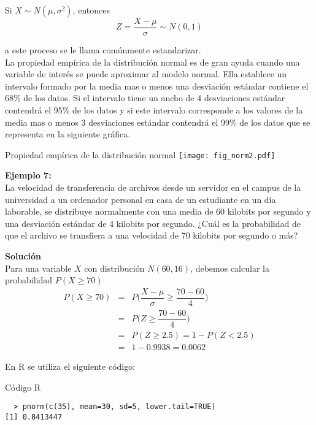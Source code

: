 \documentclass[base=hide,12pt]{elegantbook}
\begin{document}
Si $X \sim N(\mu, \sigma^{2})$, entonces \\

$$Z= \dfrac{X-\mu}{\sigma} \sim N(0,1)$$

a este proceso se le llama comúnmente estandarizar.\\

La propiedad empírica de la distribución normal es de gran ayuda cuando una variable  de interés se  puede aproximar al modelo normal. Ella establece un intervalo formado por la media mas o menos una desviación estándar contiene el 68\% de los datos. Si el intervalo tiene un ancho de 4 desviaciones estándar contendrá el 95\% de los datos y si este intervalo corresponde a los valores de la media mas o menos 3 desviaciones estándar contendrá el 99\% de los datos que se representa en la siguiente gráfica.

\begin{center}
	Propiedad empírica de la distribución normal  
	\texttt{[image: fig\_norm2.pdf]} %
\end{center}


\vspace{.5cm} 
\textcolor{col3}{\bf \large Ejemplo 7:}\\
La velocidad de transferencia de archivos desde un servidor en el campus de la universidad a un ordenador personal en casa de un estudiante en un día laborable, se distribuye normalmente con una media de 60 kilobits por segundo y una desviación estándar de 4 kilobits por segundo. ¿Cuál es la probabilidad de que el archivo se transfiera a una velocidad de 70 kilobits por segundo o más?
\vspace{1cm}

\textcolor{col3}{\bf \large Solución}\\
Para una variable $X$ con distribución $N(60,16)$, debemos calcular la probabilidad $P(X \geq 70)$ \\
\begin{eqnarray*}
	P(X \geq 70)&=&P\Bigg(\dfrac{X-\mu}{\sigma} \geq \dfrac{70-60}{4}\Bigg)\\
	&=& P\Bigg(Z \geq \dfrac{70-60}{4}\Bigg)\\
	&=& P(Z\geq 2.5)=1-P(Z < 2.5 )\\
	&=& 1-0.9938=0.0062
\end{eqnarray*}

En R se utiliza el siguiente código: 
\begin{Box3}{Código R }
\begin{verbatim}
  > pnorm(c(35), mean=30, sd=5, lower.tail=TRUE)
[1] 0.8413447
\end{verbatim}	
\end{Box3}
\vspace{1cm}
\end{document}

